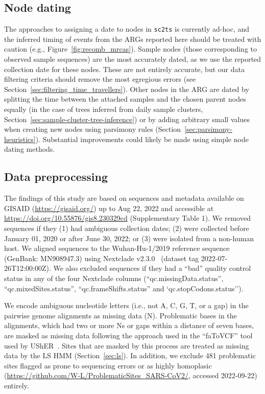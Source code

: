 \documentclass{article}
\begin{document}
\subsection{Node dating}
\label{sec:node_dating}
The approaches to assigning a date to nodes in \texttt{sc2ts} is currently
ad-hoc, and the inferred timing of events from the ARGs reported
here should be treated with caution (e.g., Figure~\ref{fig:recomb_mrcas}).
Sample nodes (those corresponding to observed sample sequences) are the
most accurately dated, as we use the reported collection date for
these nodes. These are not entirely accurate, but our data filtering
criteria should remove the most egregious errors (see
Section~\ref{sec:filtering_time_travellers}). Other nodes in the ARG
are dated by splitting the time between the attached samples
and the chosen parent nodes equally (in the case of
trees inferred from daily sample clusters,
Section~\ref{sec:sample-cluster-tree-inference}) or by adding arbitrary
small values when creating new nodes using parsimony rules
(Section~\ref{sec:parsimony-heuristics}). Substantial improvements could
likely be made using simple node dating methods.

\subsection{Data preprocessing}
\label{sec:data_preprocessing}
The findings of this study are
based on sequences and metadata available on GISAID (\url{https://gisaid.org/})
up to Aug 22, 2022 and accessible at
\url{https://doi.org/10.55876/gis8.230329cd} (Supplementary Table 1).
We removed sequences
if they (1) had ambiguous collection dates;
(2) were collected before January 01, 2020 or after June 30, 2022; or
(3) were isolated from a non-human host.
We aligned sequences to the Wuhan-Hu-1/2019 reference sequence
(GenBank: MN908947.3) using Nextclade v2.3.0~\citep{Aksamentov2021-hj} (dataset tag
2022-07-26T12:00:00Z). We also excluded sequences if they had a
``bad'' quality control status
in any of the four Nextclade columns (``qc.missingData.status'',
``qc.mixedSites.status'', ``qc.frameShifts.status'' and `qc.stopCodons.status'').

We encode ambiguous nucleotide letters (i.e.,
not A, C, G, T, or a gap) in the pairwise genome alignments as missing data
(N). Problematic bases in the alignments, which had two or more Ns or
gaps within a distance of seven bases, are masked as missing data following
the approach used in the ``faToVCF'' tool used by
UShER~\citep{Turakhia2022-it}.
Sites that are masked by this process are
treated as missing data by the LS HMM (Section~\ref{sec:ls}).
In addition, we exclude 481 problematic sites flagged as prone to
sequencing errors or as highly homoplasic
(\url{https://github.com/W-L/ProblematicSites_SARS-CoV2/},
accessed 2022-09-22) entirely.
\end{document}

